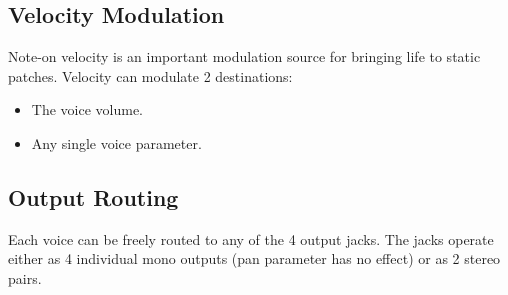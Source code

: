 \subsection{Velocity Modulation}\label{velocity-modulation}

Note-on velocity is an important modulation source for bringing life to
static patches. Velocity can modulate 2 destinations:

\begin{itemize}
\tightlist
\item
  The voice volume.
\item
  Any single voice parameter.
\end{itemize}


\subsection{Output Routing}\label{output-routing}

Each voice can be freely routed to any of the 4 output jacks. The jacks
operate either as 4 individual mono outputs (pan parameter has no
effect) or as 2 stereo pairs.

